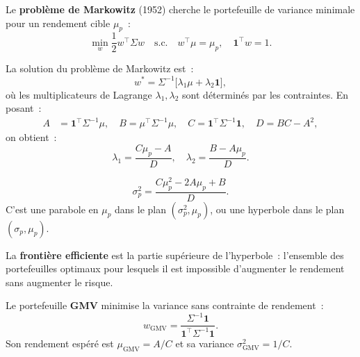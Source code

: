 \begin{definition}
Le \textbf{probl\`eme de Markowitz} (1952) cherche le portefeuille de
variance minimale pour un rendement cible $\mu_p$~:
\[
    \min_w \frac{1}{2}w^\top\Sigma w \quad \text{s.c.} \quad
    w^\top\mu = \mu_p, \quad \mathbf{1}^\top w = 1.
\]
\end{definition}

\begin{theoreme}
\label{thm:markowitz_solution}
La solution du probl\`eme de Markowitz est~:
\[
    w^* = \Sigma^{-1}\bigl[\lambda_1\mu + \lambda_2\mathbf{1}\bigr],
\]
o\`u les multiplicateurs de Lagrange $\lambda_1, \lambda_2$ sont
d\'etermin\'es par les contraintes. En posant~:
\begin{align}
    A &= \mathbf{1}^\top\Sigma^{-1}\mu, \quad
    B = \mu^\top\Sigma^{-1}\mu, \quad
    C = \mathbf{1}^\top\Sigma^{-1}\mathbf{1}, \quad
    D = BC - A^2,
\end{align}
on obtient~:
\[
    \lambda_1 = \frac{C\mu_p - A}{D}, \quad
    \lambda_2 = \frac{B - A\mu_p}{D}.
\]
\end{theoreme}

\begin{formules}[title=\textbf{Variance minimale du portefeuille optimal}]
\[
    \sigma_p^2 = \frac{C\mu_p^2 - 2A\mu_p + B}{D}.
\]
C'est une parabole en $\mu_p$ dans le plan $(\sigma_p^2, \mu_p)$,
ou une hyperbole dans le plan $(\sigma_p, \mu_p)$.
\end{formules}

\begin{definition}
La \textbf{fronti\`ere efficiente} est la partie sup\'erieure de
l'hyperbole~: l'ensemble des portefeuilles optimaux pour lesquels il est
impossible d'augmenter le rendement sans augmenter le risque.
\end{definition}

\begin{definition}
Le portefeuille \textbf{GMV} minimise la variance sans contrainte de
rendement~:
\[
    w_{\text{GMV}} = \frac{\Sigma^{-1}\mathbf{1}}
    {\mathbf{1}^\top\Sigma^{-1}\mathbf{1}}.
\]
Son rendement esp\'er\'e est $\mu_{\text{GMV}} = A/C$ et sa variance
$\sigma_{\text{GMV}}^2 = 1/C$.
\end{definition}


